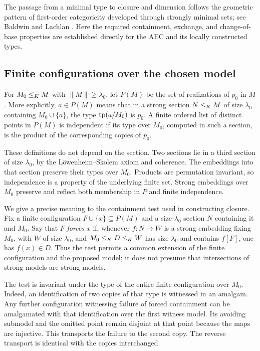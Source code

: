 The passage from a minimal type to closure and dimension follows the
geometric pattern of first-order categoricity developed through strongly
minimal sets; see Baldwin and Lachlan \cite[Sections~1--2]{BaldwinLachlan1971}.
Here the required containment, exchange, and change-of-base properties
are established directly for the AEC and its locally constructed types.

\subsection{Finite configurations over the chosen model}

\begin{definition}
\label{geom:points}
For $M_0\leq_K M$ with $\|M\|\geq\lambda_0$, let $P(M)$ be the
set of realizations of $p_0$ in $M$.  More explicitly, $a\in P(M)$
means that in a strong section $N\leq_K M$ of size $\lambda_0$
containing $M_0\cup\{a\}$, the type $\operatorname{tp}(a/M_0)$ is $p_0$.
A finite ordered list of distinct points in $P(M)$ is independent if
its type over $M_0$, computed in such a section, is the product of the
corresponding copies of $p_0$.
\end{definition}

These definitions do not depend on the section.  Two sections lie in
a third section of size $\lambda_0$, by the L\"owenheim--Skolem axiom
and coherence.  The embeddings into that section preserve their types
over $M_0$.  Products are permutation invariant, so independence is a
property of the underlying finite set.  Strong embeddings over $M_0$
preserve and reflect both membership in $P$ and finite independence.

We give a precise meaning to the containment test used in constructing
closure.  Fix a finite configuration $F\cup\{x\}\subseteq P(M)$ and
a size-$\lambda_0$ section $N$ containing it and $M_0$.  Say that $F$
\emph{forces} $x$ if, whenever $f:N\to W$ is a strong embedding fixing
$M_0$, with $W$ of size $\lambda_0$, and
$M_0\leq_K D\leq_K W$ has size $\lambda_0$ and contains $f[F]$,
one has $f(x)\in D$.  Thus the test permits a common extension of the
finite configuration and the proposed model; it does not presume that
intersections of strong models are strong models.

The test is invariant under the type of the entire finite
configuration over $M_0$.  Indeed, an identification of two copies of
that type is witnessed in an amalgam.  Any further configuration
witnessing failure of forced containment can be amalgamated with that
identification over the first witness model.  Its avoiding submodel
and the omitted point remain disjoint at that point because the maps
are injective.  This transports the failure to the second copy.  The
reverse transport is identical with the copies interchanged.

